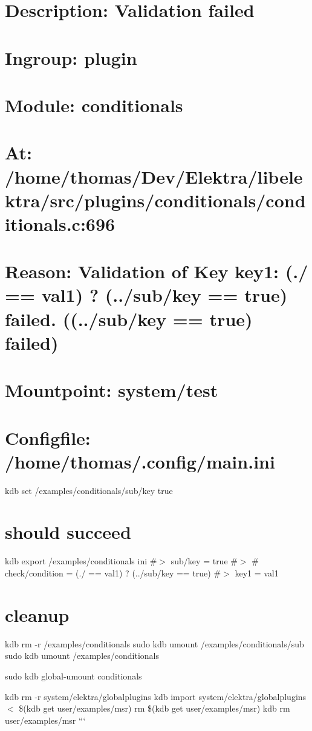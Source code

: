 \section*{Description\+: Validation failed}

\section*{Ingroup\+: plugin}

\section*{Module\+: conditionals}

\section*{At\+: /home/thomas/\+Dev/\+Elektra/libelektra/src/plugins/conditionals/conditionals.c\+:696}

\section*{Reason\+: Validation of Key key1\+: (./ == \textquotesingle{}val1\textquotesingle{}) ? (../sub/key == \textquotesingle{}true\textquotesingle{}) failed. ((../sub/key == \textquotesingle{}true\textquotesingle{}) failed)}

\section*{Mountpoint\+: system/test}

\section*{Configfile\+: /home/thomas/.config/main.\+ini}

kdb set /examples/conditionals/sub/key true

\section*{should succeed}

kdb export /examples/conditionals ini \#$>$ sub/key = true \#$>$ \# check/condition = (./ == \textquotesingle{}val1\textquotesingle{}) ? (../sub/key == \textquotesingle{}true\textquotesingle{}) \#$>$ key1 = val1

\section*{cleanup}

kdb rm -\/r /examples/conditionals sudo kdb umount /examples/conditionals/sub sudo kdb umount /examples/conditionals

sudo kdb global-\/umount conditionals

kdb rm -\/r system/elektra/globalplugins kdb import system/elektra/globalplugins $<$ \$(kdb get user/examples/msr) rm \$(kdb get user/examples/msr) kdb rm user/examples/msr ``` 